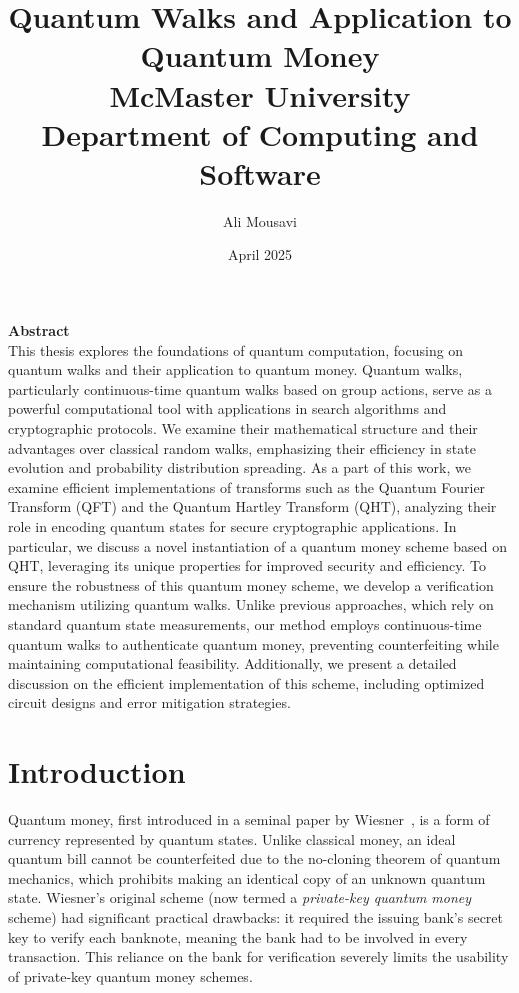 \documentclass[12pt]{report}
\title{
  Quantum Walks and Application to Quantum Money\\[1em]
  \normalsize McMaster University\\
  Department of Computing and Software
}
\author{Ali Mousavi}
\date{April 2025}
\begin{document}
\maketitle
\tableofcontents


\newpage
\textbf{\large Abstract}\\


This thesis explores the foundations of quantum computation, focusing on quantum walks and their application to quantum money. Quantum walks, particularly continuous-time quantum walks based on group actions, serve as a powerful computational tool with applications in search algorithms and cryptographic protocols. We examine their mathematical structure and their advantages over classical random walks, emphasizing their efficiency in state evolution and probability distribution spreading. As a part of this work, we examine efficient implementations of transforms such as the Quantum Fourier Transform (QFT) and the Quantum Hartley Transform (QHT), analyzing their role in encoding quantum states for secure cryptographic applications. In particular, we discuss a novel instantiation of a quantum money scheme based on QHT, leveraging its unique properties for improved security and efficiency.
To ensure the robustness of this quantum money scheme, we develop a verification mechanism utilizing quantum walks. Unlike previous approaches, which rely on standard quantum state measurements, our method employs continuous-time quantum walks to authenticate quantum money, preventing counterfeiting while maintaining computational feasibility. Additionally, we present a detailed discussion on the efficient implementation of this scheme, including optimized circuit designs and error mitigation strategies.








\chapter{Introduction}
Quantum money, first introduced in a seminal paper by Wiesner~\cite{Wiesner1983}, is a form of currency represented by quantum states. Unlike classical money, an ideal quantum bill cannot be counterfeited due to the no-cloning theorem of quantum mechanics, which prohibits making an identical copy of an unknown quantum state. Wiesner’s original scheme (now termed a \emph{private-key quantum money} scheme) had significant practical drawbacks: it required the issuing bank’s secret key to verify each banknote, meaning the bank had to be involved in every transaction. This reliance on the bank for verification severely limits the usability of private-key quantum money schemes.
\end{document}

